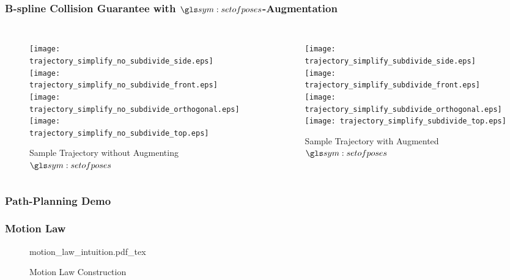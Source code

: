 \begin{frame}
	\frametitle{B-spline Collision Guarantee with $\setofposes$-Augmentation}

	\begin{columns}

			\begin{figure}[hb]
				\centering
				\begin{minipage}{0.8\linewidth}
					\texttt{[image: trajectory\_simplify\_no\_subdivide\_side.eps]}
					\texttt{[image: trajectory\_simplify\_no\_subdivide\_front.eps]}
					\texttt{[image: trajectory\_simplify\_no\_subdivide\_orthogonal.eps]}
					\texttt{[image: trajectory\_simplify\_no\_subdivide\_top.eps]}
				\end{minipage}
				\caption{Sample Trajectory without Augmenting $\setofposes$}
				\label{fig:sample_trajectory_after_simplification}
			\end{figure}

			\begin{figure}[hb]
				\centering
				\begin{minipage}{0.8\linewidth}
					\texttt{[image: trajectory\_simplify\_subdivide\_side.eps]}
					\texttt{[image: trajectory\_simplify\_subdivide\_front.eps]}
					\texttt{[image: trajectory\_simplify\_subdivide\_orthogonal.eps]}
					\texttt{[image: trajectory\_simplify\_subdivide\_top.eps]}
				\end{minipage}
				\caption{Sample Trajectory with Augmented $\setofposes$}
				\label{fig:sample_trajectory_with_augmented_set_of_poses}
			\end{figure}
	\end{columns}
\end{frame}

\begin{frame}
	\frametitle{Path-Planning Demo}

\end{frame}

\begin{frame}
	\frametitle{Motion Law}

	\begin{figure}[hb]
		\centering
		\def\svgwidth{0.5\textwidth}
		{motion_law_intuition.pdf_tex}
		\caption{Motion Law Construction}%
		\label{fig:motion_law_graphical_intuition}
	\end{figure}

\end{frame}


